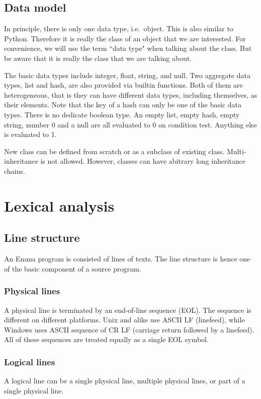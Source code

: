\documentclass[10pt,a4paper]{article}
\begin{document}
\subsection{Data model}
In principle, there is only one data type, i.e.\ object. This is also
similar to Python. Therefore it is really the class of an object that we
are interested. For convenience, we will use the term ``data type"
when talking about the class. But be aware that it is really 
the class that we are talking about.

The basic data types include integer, float, string, and null. 
Two aggregate data types, list and hash, are also provided via builtin
functions. Both of them are heterogeneous, that is they can have
different data types, including themselves, as their elements. 
Note that the key of a hash can only be one of the basic data types.
There is no dedicate boolean type. 
An empty list, empty hash, empty string, 
number 0 and a null are all evaluated to 0 on condition test. 
Anything else is evaluated to 1.

New class can be defined from scratch or as a subclass of existing
class. Multi-inheritance is not allowed. However, classes can 
have abitrary long inheritance chains.



\pagebreak

\pagebreak

\section{Lexical analysis}
\subsection{Line structure}
An Emma program is consisted of lines of texts. The line structure is
hence one of the basic component of a source program.

\subsubsection{Physical lines}
A physical line is terminated by an end-of-line sequence (EOL). The
sequence is different on different platforms. Unix and alike use ASCII LF
(linefeed), while Windows uses ASCII sequence of CR LF (carriage return followed
by a linefeed). All of these sequences are treated equally as a single 
EOL symbol.

\subsubsection{Logical lines}
A logical line can be a single physical line, multiple physical lines, or
part of a single physical line.
\end{document}
